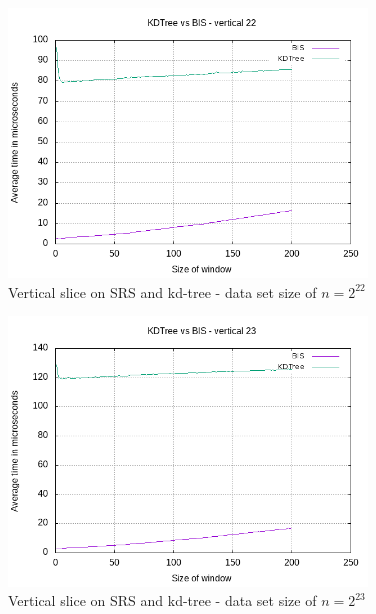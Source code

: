 \begin{figure}[h]
    \centering
    \includegraphics[width = 0.85\textwidth]{pictures/analysis/smalls/vert_22.png}
    \caption{Vertical slice on SRS and kd-tree - data set size of $n=2^{22}$}\label{fig:small_vert_22}
\end{figure}

\begin{figure}[h]
    \centering
    \includegraphics[width = 0.85\textwidth]{pictures/analysis/smalls/vert_23.png}
    \caption{Vertical slice on SRS and kd-tree - data set size of $n=2^{23}$}\label{fig:small_vert_23}
\end{figure}

